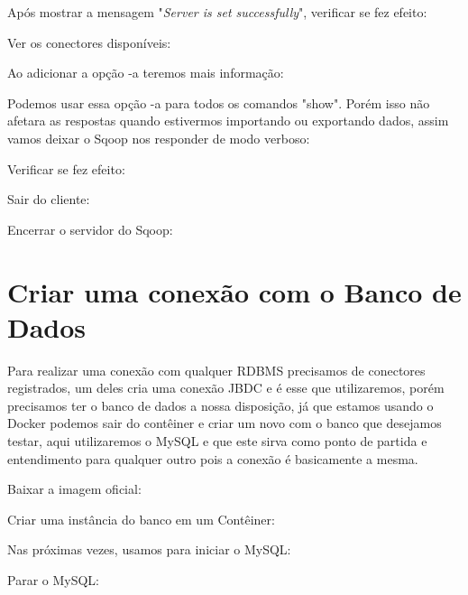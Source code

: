 \documentclass[a4paper,11pt]{article}
\begin{document}
Após mostrar a mensagem "\textit{Server is set successfully}", verificar se fez efeito: \\

Ver os conectores disponíveis: \\

Ao adicionar a opção -a teremos mais informação: \\

Podemos usar essa opção -a para todos os comandos "show". Porém isso não afetara as respostas quando estivermos importando ou exportando dados, assim vamos deixar o Sqoop nos responder de modo verboso: \\

Verificar se fez efeito: \\

Sair do cliente: \\

Encerrar o servidor do Sqoop: \\

\section{Criar uma conexão com o Banco de Dados}
Para realizar uma conexão com qualquer RDBMS precisamos de conectores registrados, um deles cria uma conexão JBDC e é esse que utilizaremos, porém precisamos ter o banco de dados a nossa disposição, já que estamos usando o Docker podemos sair do contêiner e criar um novo com o banco que desejamos testar, aqui utilizaremos o MySQL e que este sirva como ponto de partida e entendimento para qualquer outro pois a conexão é basicamente a mesma.

Baixar a imagem oficial: \\

Criar uma instância do banco em um Contêiner: \\

Nas próximas vezes, usamos para iniciar o MySQL: \\

Parar o MySQL: \\
\end{document}
